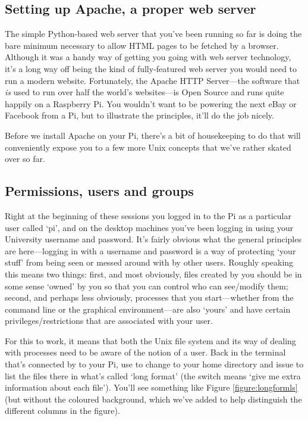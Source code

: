 \subsection{Setting up Apache, a proper web server}

The simple Python-based web server that you've been running so far is doing the bare minimum necessary to allow HTML pages to be fetched by a browser. Although it was a handy way of getting you going with web server technology, it's a long way off being the kind of fully-featured web server you would need to run a modern website. Fortunately, the Apache HTTP Server---the software that \textit{is} used to run over half the world's websites---is Open Source and runs quite happily on a Raspberry Pi. You wouldn't want to be powering the next eBay or Facebook from a Pi, but to illustrate the principles, it'll do the job nicely. 

Before we install Apache on your Pi, there's a bit of housekeeping to do that will conveniently expose you to a few more Unix concepts that we've rather skated over so far. 

\subsection{Permissions, users and groups}

Right at the beginning of these sessions you logged in to the Pi as a particular user called `pi', and on the desktop machines you've been logging in using your University username and password. It's fairly obvious what the general principles are here---logging in with a username and password is a way of protecting `your stuff' from being seen or messed around with by other users. Roughly speaking this means two things: first, and most obviously, files created by you should be in some sense `owned' by you so that you can control who can see/modify them; second, and perhaps less obviously, processes that you start---whether from the command line or the graphical environment---are also `yours' and have certain privileges/restrictions that are associated with your user. 

For this to work, it means that both the Unix file system and its way of dealing with processes need to be aware of the notion of a user. Back in the terminal that's connected by  to your Pi, use  to change to your home directory and issue  to list the files there in what's called `long format' (the  switch means `give me extra information about each file'). You'll see something like Figure \ref{figure:longformls} (but without the coloured background, which we've added to help distinguish the different columns in the figure).

